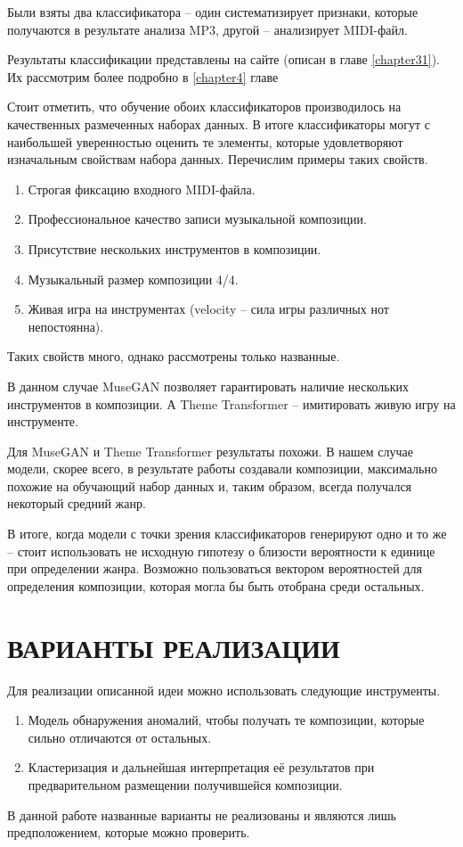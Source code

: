     Были взяты два классификатора -- один систематизирует признаки, которые получаются в результате анализа MP3, другой -- анализирует MIDI-файл.
    
    Результаты классификации представлены на сайте (описан в главе \ref{chapter31}). Их рассмотрим
    более подробно в \ref{chapter4} главе
    
    Стоит отметить, что обучение обоих классификаторов производилось на качественных размеченных наборах данных. В итоге классификаторы могут с наибольшей уверенностью оценить те элементы, которые удовлетворяют изначальным свойствам набора данных. Перечислим примеры таких свойств. 
    \begin{enumerate}
        \item Строгая фиксацию входного MIDI-файла.
        \item Профессиональное качество записи музыкальной композиции.
        \item Присутствие нескольких инструментов в композиции.
        \item Музыкальный размер композиции 4/4. 
        \item Живая игра на инструментах (velocity -- сила игры различных нот непостоянна).
    \end{enumerate}
    
    Таких свойств много, однако рассмотрены только названные.
    
    В данном случае MuseGAN позволяет гарантировать наличие нескольких инструментов в композиции. А Theme Transformer -- имитировать живую игру на инструменте.
    
    Для MuseGAN и Theme Transformer результаты похожи. В нашем случае модели, скорее всего, в результате работы создавали композиции, максимально похожие на обучающий набор данных и, таким образом, всегда получался некоторый средний жанр.
    
    В итоге, когда модели с точки зрения классификаторов генерируют одно и то же -- стоит использовать не исходную гипотезу о близости вероятности к единице при определении жанра. Возможно пользоваться вектором вероятностей для определения композиции, которая могла бы быть отобрана среди остальных. 

\section{ВАРИАНТЫ РЕАЛИЗАЦИИ}
    Для реализации описанной идеи можно использовать следующие инструменты.
    \begin{enumerate}
        \item Модель обнаружения аномалий, чтобы получать те композиции, которые сильно отличаются от остальных. 
        \item Кластеризация и дальнейшая интерпретация её результатов при предварительном размещении получившейся композиции.
    \end{enumerate}
    
    В данной работе названные варианты не реализованы и являются лишь предположением, которые можно проверить.
